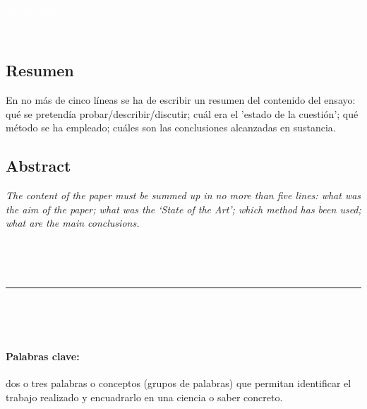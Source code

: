 \documentclass[a4paper,10pt]{report}
\newcommand{\vacio}{\textcolor{white}{holacaracola}}
\begin{document}
{%

\newpage

\renewcommand{\headrulewidth}{0.5pt}
\fancyhead[L]{\vacio}

\renewcommand{\footrulewidth}{0.5pt}
\fancyfoot[C]{\vacio}



\

\vacio

\


\subsection*{Resumen}
En no más de cinco líneas se ha de escribir un resumen del contenido del ensayo: qué se pretendía probar/describir/discutir; cuál era el 'estado de la cuestión’; qué método se ha empleado; cuáles son las conclusiones alcanzadas en sustancia.


\subsection*{Abstract}
\textsl{
The content of the paper must be summed up in no more than five lines: what was the aim of the paper; what was the ‘State of the Art’; which method has been used; what are the main conclusions.}

\ %

\

\hrule

\

\


\paragraph{Palabras clave:} dos o tres palabras o conceptos (grupos de palabras) que permitan identificar el trabajo realizado y encuadrarlo en una ciencia o saber concreto.

}
\end{document}
